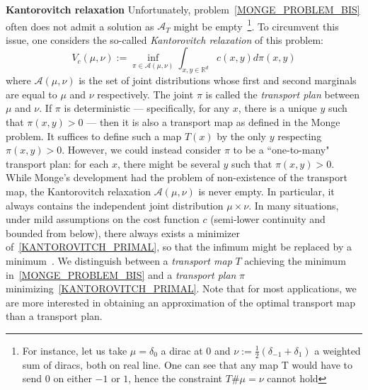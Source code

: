 \documentclass[runningheads]{llncs}
\begin{document}
\textbf{Kantorovitch relaxation} Unfortunately, problem~\eqref{MONGE_PROBLEM_BIS} often does not admit a solution as $\mathcal{A}_T$ might be empty~\footnote{For instance, let us take $\mu=\delta_0$ a dirac at $0$ and $\nu:=\frac{1}{2}(\delta_{-1}+\delta_{1})$ a weighted sum of diracs, both on real line. One can see that any map T would have to send $0$ on either $-1$ or $1$, hence the constraint $T\#\mu=\nu$ cannot hold}. To circumvent this issue, one considers the so-called \textit{Kantorovitch relaxation} of this problem:
\begin{equation}
 V_c(\mu,\nu):=\inf_{\pi \in \mathcal{A}(\mu,\nu)} \int_{ x,y \in \mathds {R}^d} c(x,y) d\pi(x,y)
 \label{KANTOROVITCH_PRIMAL}
\end{equation}
where $\mathcal{A}(\mu,\nu)$ is the set of joint distributions whose first and second marginals are equal to $\mu$ and $\nu$ respectively. The joint $\pi$ is called the \textit{transport plan} between $\mu$ and $\nu$. If $\pi$ is deterministic --- specifically, for any $x$, there is a unique $y$ such that $\pi(x,y)>0$ --- then it is also a transport map as defined in the Monge problem. It suffices to define such a map $T(x)$ by the only $y$ respecting $\pi(x,y)>0$.  However, we could instead consider $\pi$ to be a ``one-to-many" transport plan: for each $x$, there might be several $y$ such that $\pi(x,y)>0$. While Monge's development had the problem of non-existence of the transport map, the Kantorovitch relaxation $\mathcal{A}(\mu,\nu)$ is never empty. In particular, it always contains the independent joint distribution $\mu \times \nu$. In many situations, under mild assumptions on the cost function $c$ (semi-lower continuity and bounded from below), there always exists a minimizer of~\eqref{KANTOROVITCH_PRIMAL}, so that the infimum might be replaced by a minimum~\citep{Ambrosio2013}. 
We distinguish between a \emph{transport map} $T$ achieving the minimum in~\eqref{MONGE_PROBLEM_BIS} and a \emph{transport plan} $\pi$ minimizing~\eqref{KANTOROVITCH_PRIMAL}. Note that for most applications, we are more interested in obtaining an approximation of the optimal transport map than a transport plan.\\
\end{document}
